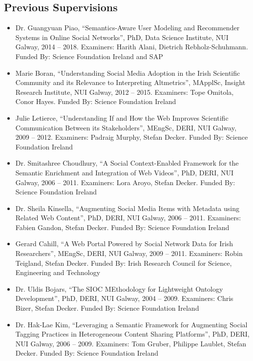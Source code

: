 \documentclass[10pt,a4paper]{res} %
\begin{document}
\begin{resume}
\subsection*{Previous Supervisions}

\begin{itemize} \itemsep -2pt
\item Dr. Guangyuan Piao, ``Semantics-Aware User Modeling and Recommender Systems in Online Social Networks'', PhD, Data Science Institute, NUI Galway, 2014 -- 2018. Examiners: Harith Alani, Dietrich Rebholz-Schuhmann. Funded By: Science Foundation Ireland and SAP %
\item Marie Boran, ``Understanding Social Media Adoption in the Irish Scientific Community and its Relevance to Interpreting Altmetrics'', MApplSc, Insight Research Institute, NUI Galway, 2012 -- 2015. Examiners: Tope Omitola, Conor Hayes. Funded By: Science Foundation Ireland
\item Julie Letierce, ``Understanding If and How the Web Improves Scientific Communication Between its Stakeholders'', MEngSc, DERI, NUI Galway, 2009 -- 2012. Examiners: Padraig Murphy, Stefan Decker. Funded By: Science Foundation Ireland
\item Dr. Smitashree Choudhury, ``A Social Context-Enabled Framework for the Semantic Enrichment and Integration of Web Videos'', PhD, DERI, NUI Galway, 2006 -- 2011. Examiners: Lora Aroyo, Stefan Decker. Funded By: Science Foundation Ireland %
\item Dr. Sheila Kinsella, ``Augmenting Social Media Items with Metadata using Related Web Content'', PhD, DERI, NUI Galway, 2006 -- 2011. Examiners: Fabien Gandon, Stefan Decker. Funded By: Science Foundation Ireland %
\item Gerard Cahill, ``A Web Portal Powered by Social Network Data for Irish Researchers'', MEngSc, DERI, NUI Galway, 2009 -- 2011. Examiners: Robin Teigland, Stefan Decker. Funded By: Irish Research Council for Science, Engineering and Technology
\item Dr. Uldis Bojars, ``The SIOC MEthodology for Lightweight Ontology Development'', PhD, DERI, NUI Galway, 2004 -- 2009. Examiners: Chris Bizer, Stefan Decker. Funded By: Science Foundation Ireland %
\item Dr. Hak-Lae Kim, ``Leveraging a Semantic Framework for Augmenting Social Tagging Practices in Heterogeneous Content Sharing Platforms'', PhD, DERI, NUI Galway, 2006 -- 2009. Examiners: Tom Gruber, Philippe Laublet, Stefan Decker. Funded By: Science Foundation Ireland %
\end{itemize}


\end{resume}
\end{document}
